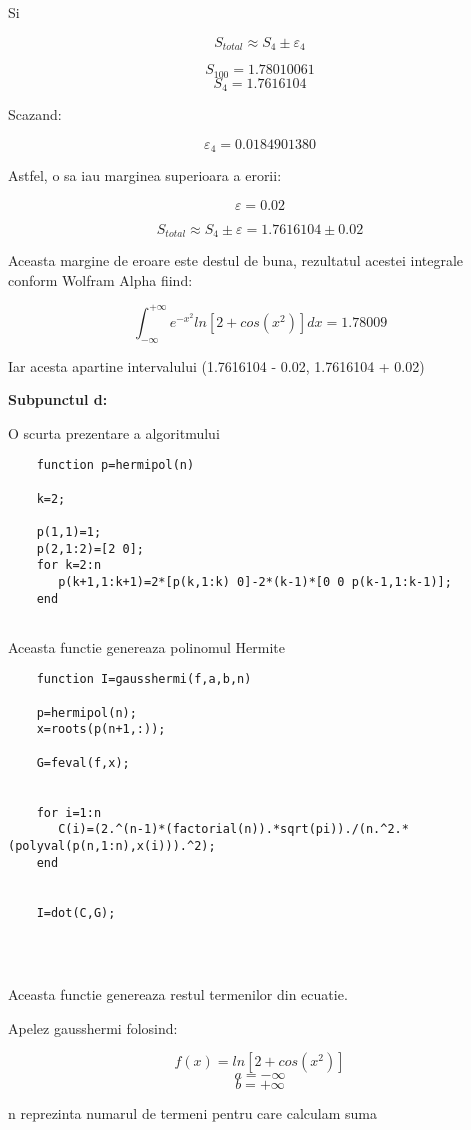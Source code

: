 \documentclass[a4paper,12pt]{article}
\begin{document}
Si

$$S_{total} \approx S_{4} \pm \varepsilon_4$$

$$S_{100} = 1.78010061$$
$$S_4 = 1.7616104$$

Scazand:

$$\varepsilon_4 = 0.0184901380$$

Astfel, o sa iau marginea superioara a erorii:

$$\varepsilon = 0.02$$

$$S_{total} \approx S_4 \pm \varepsilon = 1.7616104 \pm 0.02$$

Aceasta margine de eroare este destul de buna, rezultatul acestei integrale 
conform Wolfram Alpha fiind: 

$$\int_{-\infty}^{+\infty}e^{-x^2}ln[2+ cos(x^2)]dx = 1.78009$$

Iar acesta apartine intervalului (1.7616104 - 0.02, 1.7616104 + 0.02)


\newpage
\textbf{Subpunctul d:}
\normalsize \bigskip

O scurta prezentare a algoritmului

\begin{lstlisting}
    function p=hermipol(n)

    k=2;
    
    p(1,1)=1;
    p(2,1:2)=[2 0];
    for k=2:n
       p(k+1,1:k+1)=2*[p(k,1:k) 0]-2*(k-1)*[0 0 p(k-1,1:k-1)];
    end
    
\end{lstlisting}

Aceasta functie genereaza polinomul Hermite


\begin{lstlisting}
    function I=gausshermi(f,a,b,n)

    p=hermipol(n);
    x=roots(p(n+1,:));
    
    G=feval(f,x);		
    
    
    for i=1:n
       C(i)=(2.^(n-1)*(factorial(n)).*sqrt(pi))./(n.^2.*(polyval(p(n,1:n),x(i))).^2);
    end
    
    
    I=dot(C,G);
    
    
    
\end{lstlisting}

Aceasta functie genereaza restul termenilor din ecuatie.

Apelez gausshermi folosind:

$$f(x) = ln[2 + cos(x^2)]$$
$$a = -\infty$$
$$b = +\infty$$

n reprezinta numarul de termeni pentru care calculam suma
\end{document}
